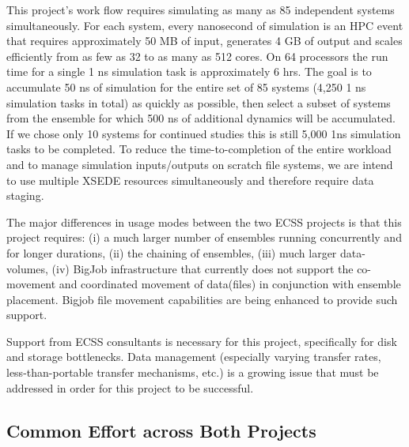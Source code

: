 \documentclass{sig-alternate}
\begin{document}
This project's work flow requires simulating as many as 85 independent systems
simultaneously. For each system, every nanosecond of simulation is an HPC event
that requires approximately 50 MB of input, generates 4 GB of output and scales
efficiently from as few as 32 to as many as 512 cores. On 64 processors the run
time for a single 1 ns simulation task is approximately 6 hrs. The goal is to
accumulate 50 ns of simulation for the entire set of 85 systems (4,250 1 ns
simulation tasks in total) as quickly as possible, then select a subset of
systems from the ensemble for which 500 ns of additional dynamics will be
accumulated. If we chose only 10 systems for continued studies this is still
5,000 1ns simulation tasks to be completed. To reduce the time-to-completion of
the entire workload and to manage simulation inputs/outputs on scratch file
systems, we are intend to use multiple XSEDE resources simultaneously and
therefore require data staging.

The major differences in usage modes between the two ECSS projects is that this
project requires: (i) a much larger number of ensembles running concurrently and
for longer durations, (ii) the chaining of ensembles, (iii) much larger
data-volumes, (iv)  BigJob infrastructure that currently does not support the
co-movement and coordinated movement of data(files) in conjunction with ensemble
placement. Bigjob file movement capabilities are being enhanced to provide
such support.

Support from ECSS consultants is necessary for this project, specifically for disk
and storage bottlenecks. Data management (especially varying transfer rates,
less-than-portable transfer mechanisms, etc.) is a growing issue that must be 
addressed in order for this project to be successful.

\subsection{Common Effort across Both Projects}
\end{document}
